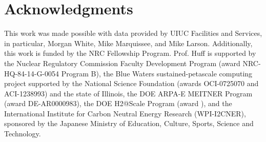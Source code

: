 \section{Acknowledgments}

This work was made possible with data provided by UIUC Facilities and Services, 
in particular, Morgan White, Mike Marquissee, and Mike Larson. Additionally, 
this work is funded by the NRC Fellowship Program. Prof. Huff is supported by 
the Nuclear Regulatory Commission Faculty
Development Program (award NRC-HQ-84-14-G-0054 Program B), the Blue Waters
sustained-petascale computing project supported by the National Science
Foundation (awards OCI-0725070 and ACI-1238993) and the state of Illinois,
the DOE ARPA-E MEITNER Program (award DE-AR0000983), the DOE H2@Scale
Program (award ), and the International Institute for Carbon Neutral Energy
Research (WPI-I2CNER), sponsored by the Japanese Ministry of Education,
Culture, Sports, Science and Technology.